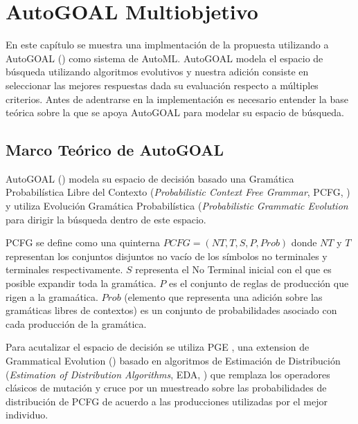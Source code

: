 \chapter{AutoGOAL Multiobjetivo}\label{chapter:implementation}
En este cap\'itulo se muestra una implmentaci\'on de la propuesta utilizando a AutoGOAL (\cite{estevez2020solving}) como sistema de AutoML. AutoGOAL modela el espacio de b\'usqueda utilizando algoritmos evolutivos y nuestra adici\'on consiste en seleccionar las mejores respuestas dada su evaluaci\'on respecto a m\'ultiples criterios. Antes de adentrarse en la implementaci\'on es necesario entender la base te\'orica sobre la que se apoya AutoGOAL para modelar su espacio  de b\'usqueda. 

\section{Marco Te\'orico de AutoGOAL}

AutoGOAL (\cite{estevez2020solving}) modela su espacio de decisi\'on basado una Gram\'atica Probabil\'istica  Libre del Contexto (\textit{Probabilistic Context Free Grammar}, PCFG, \cite{megane2021probabilistic}) y utiliza Evoluci\'on Gram\'atica Probabil\'istica (\textit{Probabilistic Grammatic Evolution} para dirigir la b\'usqueda dentro de este espacio. 

PCFG se define como una quinterna $PCFG = (NT, T, S, P, Prob)$ donde $NT$ y $T$ representan los conjuntos disjuntos no vac\'io de los s\'imbolos no terminales y terminales respectivamente. $S$ representa el No Terminal inicial con el que es posible expandir toda la gram\'atica. $P$ es el conjunto de reglas de producci\'on que rigen a la grama\'atica. $Prob$ (elemento que representa una adici\'on sobre las gram\'aticas libres de contextos) es un conjunto de probabilidades asociado con cada producci\'on de la gram\'atica. 

Para acutalizar el espacio de decisi\'on  se utiliza  PGE , una extension de Grammatical Evolution (\cite{o2001grammatical}) basado en algoritmos de Estimaci\'on de Distribuci\'on (\textit{Estimation of Distribution Algorithms}, EDA, \cite{larranaga2001estimation}) que remplaza los operadores cl\'asicos de mutaci\'on y cruce por un muestreado sobre las probabilidades de distribuci\'on de PCFG de acuerdo a las producciones utilizadas por el mejor individuo. 

